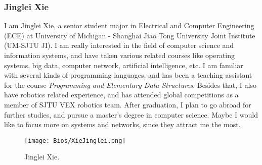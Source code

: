 \documentclass[11pt,a4paper]{article}
\begin{document}
\begin{onehalfspace}
\subsubsection{Jinglei Xie}
I am Jinglei Xie, a senior student major in Electrical and Computer Engineering (ECE) at University of Michigan - Shanghai Jiao Tong University Joint Institute (UM-SJTU JI). I am really interested in the field of computer science and information systems, and have taken various related courses like operating systems, big data, computer network, artificial intelligence, etc. I am familiar with several kinds of programming languages, and has been a teaching assistant for the course \textit{Programming and Elementary Data Structures}. Besides that, I also have robotics related experience, and has attended global competitions as a member of SJTU VEX robotics team. After graduation, I plan to go abroad for further studies, and pursue a master's degree in computer science. Maybe I would like to focus more on systems and networks, since they attract me the most.




\begin{figure}[H]
	\centering
	\texttt{[image: Bios/XieJinglei.png]}
	\caption{Jinglei Xie.}
\end{figure} 
\end{onehalfspace}
\end{document}
